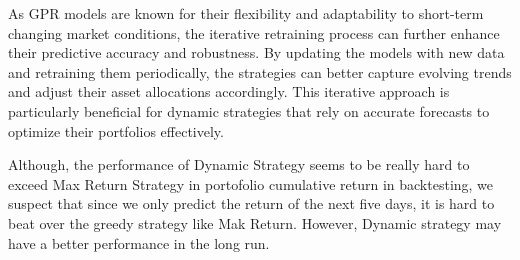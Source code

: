As \ac{GPR} models are known for their flexibility and adaptability to short-term changing market conditions, the iterative retraining process can further enhance their predictive accuracy and robustness. By updating the models with new data and retraining them periodically, the strategies can better capture evolving trends and adjust their asset allocations accordingly. 
This iterative approach is particularly beneficial for dynamic strategies that rely on accurate forecasts to optimize their portfolios effectively.

Although, the performance of Dynamic Strategy seems to be really hard to exceed Max Return Strategy in portofolio cumulative return in backtesting, we suspect that since we only predict the return of the next five days, it is hard to beat over the greedy strategy like Mak Return.
However, Dynamic strategy may have a better performance in the long run.



